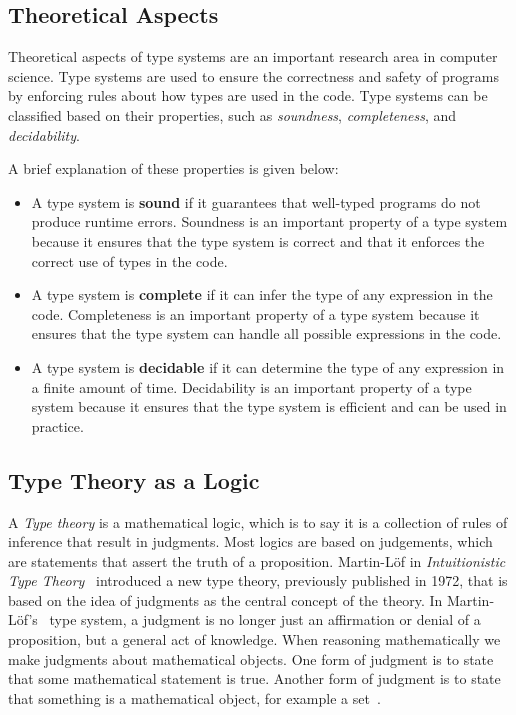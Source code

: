 \subsection{Theoretical Aspects}\label{subsec:TheoreticalAspects}

Theoretical aspects of type systems are an important research area in computer science. Type systems are used to ensure the correctness and safety of programs by enforcing rules about how types are used in the code. Type systems can be classified based on their properties, such as \textit{soundness}, \textit{completeness}, and \textit{decidability}.

A brief explanation of these properties is given below:
\begin{itemize}
    \item A type system is \textbf{sound} if it guarantees that well-typed programs do not produce runtime errors. Soundness is an important property of a type system because it ensures that the type system is correct and that it enforces the correct use of types in the code.
    \item A type system is \textbf{complete} if it can infer the type of any expression in the code. Completeness is an important property of a type system because it ensures that the type system can handle all possible expressions in the code.
    \item A type system is \textbf{decidable} if it can determine the type of any expression in a finite amount of time. Decidability is an important property of a type system because it ensures that the type system is efficient and can be used in practice.
\end{itemize}

\subsection{Type Theory as a Logic}\label{subsec:TypeTheoryAsALogic}

A \textit{Type theory} is a mathematical logic, which is to say it is a collection of rules of inference that result in judgments.
Most logics are based on judgements, which are statements that assert the truth of a proposition.
Martin-L\"of in \textit{Intuitionistic Type Theory}~\cite{Martin84} introduced a new type theory, previously published in 1972, that is based on the idea of judgments as the central concept of the theory.
In Martin-L\"of's~\cite{Martin96} type system, a judgment is no longer just an affirmation or denial of a proposition, but a general act of knowledge. When reasoning mathematically we make judgments about mathematical objects. One form of judgment is to state that some mathematical statement is true. Another form of judgment is to state that something is a mathematical object, for example a set~\cite{sep-type-theory-intuitionistic}.

